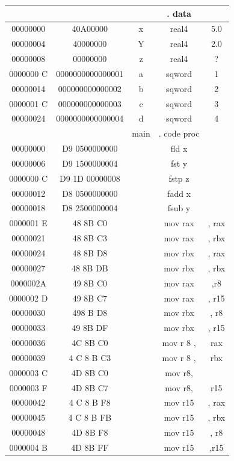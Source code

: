 \documentclass[10pt]{article}
\begin{document}
\begin{center}
\begin{tabular}{|c|c|c|c|c|}
\hline
 &  &  & . data &  \\
\hline
00000000 & 40A00000 & x & real4 & 5.0 \\
\hline
00000004 & 40000000 & Y & real4 & 2.0 \\
\hline
00000008 & 00000000 & z & real4 & ? \\
\hline
0000000 C & 0000000000000001 & a & sqword & 1 \\
\hline
00000014 & 000000000000002 & b & sqword & 2 \\
\hline
0000001 C & 000000000000003 & c & sqword & 3 \\
\hline
00000024 & 0000000000000004 & d & sqword & 4 \\
\hline
 &  & main & . code proc &  \\
\hline
00000000 & D9 0500000000 &  & fld x &  \\
\hline
00000006 & D9 1500000004 &  & fst y &  \\
\hline
0000000 C & D9 1D 00000008 &  & fstp z &  \\
\hline
00000012 & D8 0500000000 &  & fadd x &  \\
\hline
00000018 & D8 2500000004 &  & fsub y &  \\
\hline
0000001 E & 48 8B C0 &  & mov rax & , rax \\
\hline
00000021 & 48 8B C3 &  & mov rax & , rbx \\
\hline
00000024 & 48 8B D8 &  & mov rbx & , rax \\
\hline
00000027 & 48 8B DB &  & mov rbx & , rbx \\
\hline
0000002A & 49 8B C0 &  & mov rax & ,r8 \\
\hline
0000002 D & 49 8B C7 &  & mov rax & , r15 \\
\hline
00000030 & 498 B D8 &  & mov rbx & , r8 \\
\hline
00000033 & 49 8B DF &  & mov rbx & , r15 \\
\hline
00000036 & 4C 8B C0 &  & mov r 8 , & rax \\
\hline
00000039 & 4 C 8 B C3 &  & mov r 8 , & rbx \\
\hline
0000003 C & 4D 8B C0 &  & mov r8, &  \\
\hline
0000003 F & 4D 8B C7 &  & mov r8, & r15 \\
\hline
00000042 & 4 C 8 B F8 &  & mov r15 & , rax \\
\hline
00000045 & 4 C 8 B FB &  & mov r15 & , rbx \\
\hline
00000048 & 4D 8B F8 &  & mov r15 & , r8 \\
\hline
0000004 B & 4D 8B FF &  & mov r15 & ,r15 \\
\hline
\end{tabular}
\end{center}
\end{document}
